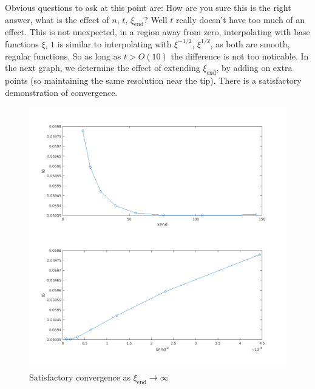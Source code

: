 \documentclass{jfm}
\begin{document}
Obvious questions to ask at this point are: How are you sure this is the right
answer, what is the effect of $n$, $t$, $\xi_{\mathrm{end}}$? Well $t$ really
doesn't have too much of an effect. This is not unexpected, in a region away
from zero, interpolating with base functions $\xi$, $1$ is similar to 
interpolating with $\xi^{-1/2}$, $\xi^{1/2}$, as both are smooth, regular 
functions. So as long as $t > O(10)$ the difference is not too noticable.
In the next graph, we determine the effect of extending $\xi_{\mathrm{end}}$,
by adding on extra points (so maintaining the same resolution near the tip).
There is a satisfactory demonstration of convergence.
\begin{figure}
  \centerline{\includegraphics[scale=0.3]{./../../Graphs/xend-march.png}}
  \caption{Satisfactory convergence as $\xi_{\mathrm{end}} \to \infty$}
\end{figure}
\end{document}

